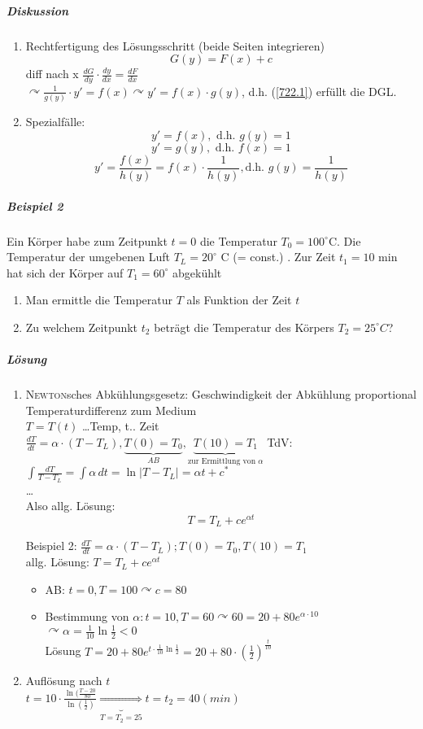 \documentclass[a4paper]{scrartcl}
\begin{document}
\subparagraph{Diskussion}
\begin{enumerate}
\item Rechtfertigung des Lösungsschritt (beide Seiten integrieren)
\begin{equation}\label{722.1} G(y) = F(x) + c \end{equation}
diff nach x $\frac{dG}{dy} \cdot \frac{dy}{dx} = \frac{dF}{dx}$\\
$\curvearrowright \frac{1}{g(y)} \cdot y' = f(x) \curvearrowright y' = f(x) \cdot g(y)$, d.h. (\ref{722.1}) erfüllt die DGL.
\item Spezialfälle:
\[ y' = f(x), \text{ d.h. } g(y) = 1\]
\[ y' = g(y), \text{ d.h. } f(x) = 1\]
\[ y' = \frac{f(x)}{h(y)} = f(x) \cdot \frac{1}{h(y)}, \text{d.h. } g(y) = \frac{1}{h(y)}\]
\end{enumerate}
\subparagraph{Beispiel 2} Ein Körper habe zum Zeitpunkt $t=0$ die Temperatur $T_0 = 100^\circ $C. Die Temperatur der umgebenen Luft $T_L = 20^\circ$ C (= const.) . Zur Zeit $t_1 = 10$ min hat sich der Körper  auf $T_1 = 60^\circ$ abgekühlt
\begin{enumerate}
\item Man ermittle die Temperatur $T$ als Funktion  der Zeit $t$
\item Zu welchem Zeitpunkt $t_2$ beträgt die Temperatur des Körpers $T_2 = 25^\circ C$?
\end{enumerate}

\subparagraph{Lösung}
\begin{enumerate}
\item \textsc{Newton}sches Abkühlungsgesetz: Geschwindigkeit der Abkühlung proportional Temperaturdifferenz zum Medium\\
$T=T(t)$ \dots Temp, t.. Zeit \\
$\frac{dT}{dt} = \alpha \cdot (T-T_L), \underbrace{T(0) = T_0}_{AB},\underbrace{T(10) = T_1}_{\text{zur Ermittlung von } \alpha}$
TdV: $\int \frac{dT}{T-T_L} = \int \alpha \, dt = \ln{\lvert T - T_L\rvert} = \alpha t + c^*$\\
\dots\\
Also allg. Lösung: \[T = T_L + c e^{\alpha t}\]


Beispiel 2: $\frac{dT}{dt} = \alpha \cdot (T-T_L); T(0) = T_0, T(10) = T_1$\\
allg. Lösung: $T=T_L + c e^{\alpha t}$
\begin{itemize}
\item AB: $t=0,T=100 \curvearrowright c=80$
\item Bestimmung von $\alpha: t=10,T=60 \curvearrowright 60 = 20 + 80 e^{\alpha \cdot 10}$\\
$\curvearrowright \alpha = \frac{1}{10} \ln{\frac{1}{2}} < 0$\\
Lösung $T=20+ 80 e^{t \cdot \frac{1}{10} \ln{\frac{1}{2}}} = 20 + 80 \cdot ( \frac{1}{2})^{\frac{t}{10}}$
\end{itemize}
\item Auflösung nach $t$ \\
$t=10 \cdot \frac{\ln{(\frac{T-20}{80}}}{\ln{(\frac{1}{2})}} \underbrace{\Rightarrow}_{T=T_2=25} t=t_2=40 (min)$

\end{enumerate}
\end{document}
